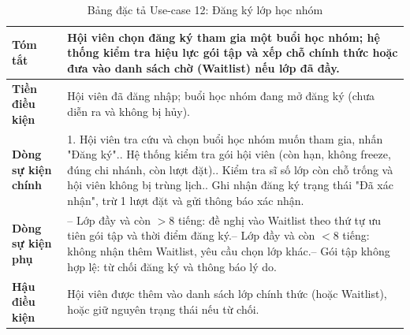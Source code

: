 \documentclass[a4paper,12pt]{article}
\begin{document}
\begin{table}[H]\centering\footnotesize
\begin{tabularx}{\textwidth}{|L{3.2cm}|Y|}
\hline \textbf{Tóm tắt} & Hội viên chọn đăng ký tham gia một buổi học nhóm; hệ thống kiểm tra hiệu lực gói tập và xếp chỗ chính thức hoặc đưa vào danh sách chờ (Waitlist) nếu lớp đã đầy. \\ \hline
\textbf{Tiền điều kiện} & Hội viên đã đăng nhập; buổi học nhóm đang mở đăng ký (chưa diễn ra và không bị hủy). \\ \hline
\textbf{Dòng sự kiện chính} & 1. Hội viên tra cứu và chọn buổi học nhóm muốn tham gia, nhấn "Đăng ký".. Hệ thống kiểm tra gói hội viên (còn hạn, không freeze, đúng chi nhánh, còn lượt đặt).. Kiểm tra sĩ số lớp còn chỗ trống và hội viên không bị trùng lịch.. Ghi nhận đăng ký trạng thái "Đã xác nhận", trừ 1 lượt đặt và gửi thông báo xác nhận. \\ \hline
\textbf{Dòng sự kiện phụ} & -- Lớp đầy và còn $> 8$ tiếng: đề nghị vào Waitlist theo thứ tự ưu tiên gói tập và thời điểm đăng ký.\newline -- Lớp đầy và còn $< 8$ tiếng: không nhận thêm Waitlist, yêu cầu chọn lớp khác.\newline -- Gói tập không hợp lệ: từ chối đăng ký và thông báo lý do. \\ \hline
\textbf{Hậu điều kiện} & Hội viên được thêm vào danh sách lớp chính thức (hoặc Waitlist), hoặc giữ nguyên trạng thái nếu từ chối. \\ \hline
\end{tabularx}
\caption{Bảng đặc tả Use-case 12: Đăng ký lớp học nhóm}
\end{table}
\end{document}
